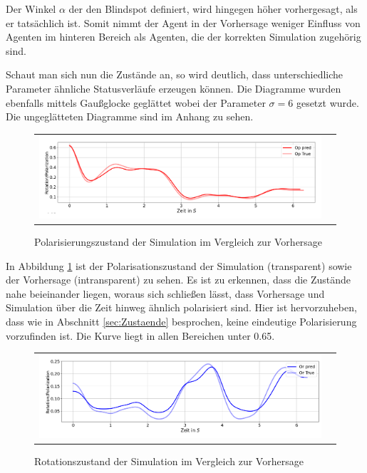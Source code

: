Der Winkel $\alpha$ der den Blindspot definiert, wird hingegen höher vorhergesagt, als er tatsächlich ist. Somit nimmt der Agent in der Vorhersage weniger Einfluss von Agenten im hinteren Bereich als Agenten, die der korrekten Simulation zugehörig sind.


Schaut man sich nun die Zustände an, so wird deutlich, dass unterschiedliche Parameter ähnliche Statusverläufe erzeugen können.
Die Diagramme wurden ebenfalls mittels Gaußglocke geglättet wobei der Parameter $\sigma = 6$ gesetzt wurde.
Die ungeglätteten Diagramme sind im Anhang zu sehen.

\begin{figure}[H]
\centering
\begin{tabular}{cc}
\includegraphics[width=1.0\textwidth]{figures/Experimente/10Fisch/Polarisierung.png} 
\end{tabular}
\caption{Polarisierungszustand der Simulation im Vergleich zur Vorhersage \label{fig:Pol10FischeStatisch}}
\end{figure}

In Abbildung \ref{fig:Pol10FischeStatisch} ist der Polarisationszustand der Simulation (transparent) sowie der Vorhersage (intransparent) zu sehen. Es ist zu erkennen, dass die Zustände nahe beieinander liegen, woraus sich schließen lässt, dass Vorhersage und Simulation über die Zeit hinweg ähnlich polarisiert sind. Hier ist hervorzuheben, dass wie in Abschnitt \ref{sec:Zustaende} besprochen, keine eindeutige Polarisierung vorzufinden ist. Die Kurve liegt in allen Bereichen unter 0.65.

\begin{figure}[H]
\centering
\begin{tabular}{cc}
\includegraphics[width=1.0\textwidth]{figures/Experimente/10Fisch/Rotation.png} 
\end{tabular}
\caption{Rotationszustand der Simulation im Vergleich zur Vorhersage \label{fig:Rot10FischeStatisch}}
\end{figure}

